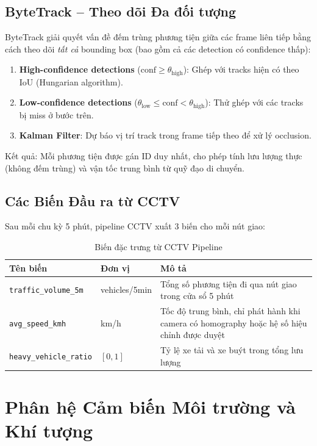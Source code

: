 \subsection{ByteTrack -- Theo dõi Đa đối tượng}
ByteTrack \cite{zhang2020bytetrack} giải quyết vấn đề đếm trùng phương tiện giữa các frame liên tiếp bằng cách theo dõi \textit{tất cả} bounding box (bao gồm cả các detection có confidence thấp):
\begin{enumerate}[leftmargin=1.5cm, itemsep=4pt]
  \item \textbf{High-confidence detections} ($\text{conf} \geq \theta_{\text{high}}$): Ghép với tracks hiện có theo IoU (Hungarian algorithm).
  \item \textbf{Low-confidence detections} ($\theta_{\text{low}} \leq \text{conf} < \theta_{\text{high}}$): Thử ghép với các tracks bị miss ở bước trên.
  \item \textbf{Kalman Filter}: Dự báo vị trí track trong frame tiếp theo để xử lý occlusion.
\end{enumerate}
Kết quả: Mỗi phương tiện được gán ID duy nhất, cho phép tính lưu lượng thực (không đếm trùng) và vận tốc trung bình từ quỹ đạo di chuyển.
\subsection{Các Biến Đầu ra từ CCTV}
Sau mỗi chu kỳ 5 phút, pipeline CCTV xuất 3 biến cho mỗi nút giao:
\begin{table}[H]
\centering
\caption{Biến đặc trưng từ CCTV Pipeline}
\label{tab:cctv_features}
\renewcommand{\arraystretch}{1.4}
\begin{tabular}{p{4.2cm} p{2.2cm} p{5.6cm}}
\toprule
\textbf{Tên biến} & \textbf{Đơn vị} & \textbf{Mô tả} \\
\midrule
\texttt{traffic\_volume\_5m} & vehicles/5min & Tổng số phương tiện đi qua nút giao trong cửa sổ 5 phút \\
\rowcolor{rowgray}
\texttt{avg\_speed\_kmh} & km/h & Tốc độ trung bình, chỉ phát hành khi camera có homography hoặc hệ số hiệu chỉnh được duyệt \\
\texttt{heavy\_vehicle\_ratio} & $[0,1]$ & Tỷ lệ xe tải và xe buýt trong tổng lưu lượng \\
\bottomrule
\end{tabular}
\end{table}
\section{Phân hệ Cảm biến Môi trường và Khí tượng}
